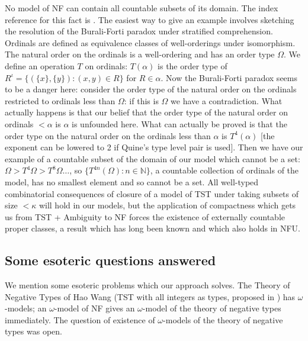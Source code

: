 \documentclass{article}
\theoremstyle{definition}
\theoremstyle{remark}
\begin{document}
{  No model of NF can contain all countable subsets of its domain. The index reference for this fact is \cite{rosserwang}.  The easiest way to give an example involves sketching the resolution of the Burali-Forti paradox under stratified comprehension.  Ordinals are defined as equivalence classes of well-orderings under isomorphism.  The natural order on the ordinals is a well-ordering and has an order type $\Omega$.  We define an operation
  $T$ on ordinals:  $T(\alpha)$ is the order type of $R^\iota = \{(\{x\},\{y\}):(x,y)\in R\}$ for $R \in \alpha$.  Now the Burali-Forti paradox seems to be a danger here:  consider the order type of the natural order on the ordinals restricted to ordinals less than $\Omega$:  if this is $\Omega$ we have a contradiction.  What actually happens is
  that our belief that the order type of the natural order on ordinals $<\alpha$ is $\alpha$ is unfounded here.  What can actually be proved is that the order type on the natural order on the ordinals less than $\alpha$ is $T^4(\alpha)$ [the exponent can be lowered to 2 if Quine's type level pair is used].  Then we have our example of a countable subset of the domain of our model which cannot be a set:  $\Omega > T^4{\Omega} > T^8{\Omega}\ldots$, so $\{T^{4n}(\Omega):n \in \mathbb N\}$, a countable collection of ordinals of the model, has no smallest element and so cannot be a set.  All well-typed combinatorial consequences
of closure of a model of TST under taking subsets of size $<\kappa$ will hold in our models, but the application of compactness which gets us from TST + Ambiguity to NF forces the existence of externally countable proper classes, a result which has long been known and which also holds in NFU.

\subsection{Some esoteric questions answered}

We mention some esoteric problems which our approach solves.  The Theory of Negative Types of Hao Wang (TST with all integers as types, proposed in \cite{tnt})  has $\omega$-models;  an $\omega$-model of NF gives an $\omega$-model of the theory of negative types  immediately.  The question of existence of $\omega$-models of the theory of negative types was open.

}
\end{document}
